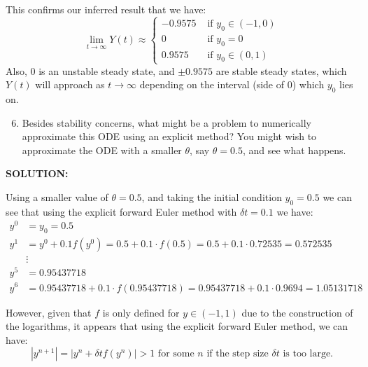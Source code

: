 \documentclass[]{article}
\begin{document}
\noindent This confirms our inferred result that we have:
\[
  \lim_{t\to\infty} Y(t) \approx
  \begin{cases}
    -0.9575 &\text{ if } y_0 \in (-1,0)\\[3pt]
    0     &\text{ if } y_0 = 0\\[3pt]
    0.9575  &\text{ if } y_0 \in (0,1)
  \end{cases}
\]
\noindent Also, $0$ is an unstable steady state, and $\pm 0.9575$ are stable steady states, which $Y(t)$ will approach as $t \to \infty$ depending on the interval (side of $0$) which $y_0$ lies on.
  

\begin{enumerate}
    \setcounter{enumi}{5}
  \item Besides stability concerns, what might be a problem to numerically approximate this ODE using an explicit method? You might wish to approximate the ODE with a smaller $\theta$, say $\theta = 0.5$, and see what happens.
  \end{enumerate}
  \vspace{-0.1cm}
  \noindent \textbf{SOLUTION:} \newline
  
  \noindent Using a smaller value of $\theta = 0.5$, and taking the initial condition $y_0 = 0.5$ we can see that using the explicit forward Euler method with $\delta t = 0.1$ we have:
        \begin{align*}
        y^0 &= y_0 = 0.5\\
        y^1 &= y^0 + 0.1f(y^0) = 0.5+0.1\cdot f(0.5) = 0.5+0.1\cdot 0.72535 = 0.572535\\
        & \vdots\\
        y^5 &=0.95437718 \\
        y^6 &=  0.95437718 + 0.1 \cdot f(0.95437718) =0.95437718 + 0.1 \cdot0.9694 =1.05131718
        \end{align*}

    \noindent However, given that $f$ is only defined for $y \in (-1,1)$ due to the construction of the logarithms, it appears that using the explicit forward Euler method, we can have:
    \[|y^{n+1}| = |y^n+\delta t f(y^n)| >1  \text{ for some $n$ if the step size }\delta t \text{ is too large.}\]
\end{document}
